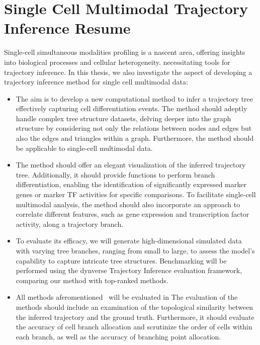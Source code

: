 \section{Single Cell Multimodal Trajectory Inference Resume}
\label{bgTI:objective}
Single-cell simultaneous modalities profiling is a nascent area, offering insights into biological processes and cellular heterogeneity. necessitating tools for trajectory inference. In this thesis, we also investigate the aspect of developing a trajectory inference method for single cell multimodal data:
\begin{itemize}
	\item
	The aim is to develop a new computational method to infer a trajectory tree effectively capturing cell differentiation events. The method should adeptly handle complex tree structure datasets, delving deeper into the graph structure by considering not only the relations between nodes and edges but also the edges and triangles within a graph. Furthermore, the method should be applicable to single-cell multimodal data.

	\item
	The method should offer an elegant visualization of the inferred trajectory tree. Additionally, it should provide functions to perform branch differentiation, enabling the identification of significantly expressed marker genes or marker TF activities for specific comparisons. To facilitate single-cell multimodal analysis, the method should also incorporate an approach to correlate different features, such as gene expression and transcription factor activity, along a trajectory branch.

	\item
	To evaluate its efficacy, we will generate high-dimensional simulated data with varying tree branches, ranging from small to large, to assess the model's capability to capture intricate tree structures. Benchmarking will be performed using the dynverse Trajectory Inference evaluation framework, comparing our method with top-ranked methods.

	\item
	All methods aferomentioned~ will be evaluated in  The evaluation of the methods should include an examination of the topological similarity between the inferred trajectory and the ground truth. Furthermore, it should evaluate the accuracy of cell branch allocation and scrutinize the order of cells within each branch, as well as the accuracy of branching point allocation.


\end{itemize}
